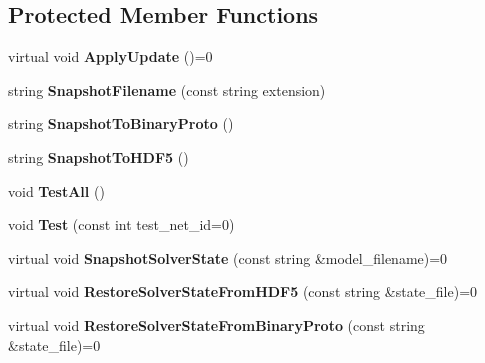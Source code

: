 \subsection*{Protected Member Functions}
\begin{DoxyCompactItemize}
\item 
\mbox{\label{classcaffe_1_1_solver_a798f08452f76d3c328e95fa0acdb2b4d}} 
virtual void {\bfseries Apply\+Update} ()=0
\item 
\mbox{\label{classcaffe_1_1_solver_aa05c6b201186bf8425c7b3cdd173daa8}} 
string {\bfseries Snapshot\+Filename} (const string extension)
\item 
\mbox{\label{classcaffe_1_1_solver_ad80ddf6a4dee3706ea91be22bcb1273a}} 
string {\bfseries Snapshot\+To\+Binary\+Proto} ()
\item 
\mbox{\label{classcaffe_1_1_solver_ab6640d8667ba3cb6e492c83c8f8943fc}} 
string {\bfseries Snapshot\+To\+H\+D\+F5} ()
\item 
\mbox{\label{classcaffe_1_1_solver_ac952acb7d33593bac88173ec31481647}} 
void {\bfseries Test\+All} ()
\item 
\mbox{\label{classcaffe_1_1_solver_a9364674374a00fa60cfa7627cce99894}} 
void {\bfseries Test} (const int test\+\_\+net\+\_\+id=0)
\item 
\mbox{\label{classcaffe_1_1_solver_a521bf1546c71c27bec8e33c91eebdfe9}} 
virtual void {\bfseries Snapshot\+Solver\+State} (const string \&model\+\_\+filename)=0
\item 
\mbox{\label{classcaffe_1_1_solver_ae9d89820d020a5f26460183d7f67009e}} 
virtual void {\bfseries Restore\+Solver\+State\+From\+H\+D\+F5} (const string \&state\+\_\+file)=0
\item 
\mbox{\label{classcaffe_1_1_solver_ab532eca6ca2b9c8e9374ed8c582f7957}} 
virtual void {\bfseries Restore\+Solver\+State\+From\+Binary\+Proto} (const string \&state\+\_\+file)=0
\item 
\mbox{\label{classcaffe_1_1_solver_a321a24e0422c6f95895f57ed9732192a}} 

\end{DoxyCompactItemize}
